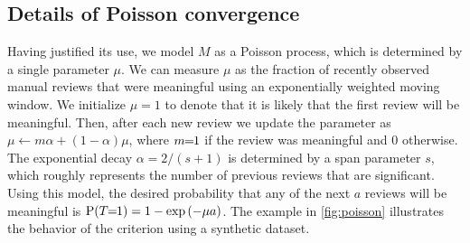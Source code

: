 \subsection{Details of Poisson convergence}

Having justified its use, we model $M$ as a Poisson process, which is determined by a single parameter $\mu$.
We can measure $\mu$ as the fraction of recently observed manual reviews that were meaningful using an
  exponentially weighted moving window.
We initialize $\mu=1$ to denote that it is likely that the first review will be meaningful.
Then, after each new review we update the parameter as %
$\mu \leftarrow m \alpha + (1 - \alpha) \mu$, where $m\mkern-6mu=\mkern-6mu1$ if the review was meaningful and $0$ otherwise.
The exponential decay $\alpha = 2 / (s + 1)$ is determined by a span parameter $s$, which roughly represents the
  number of previous reviews that are significant.
Using this model, the desired probability that any of the next $a$ reviews will be meaningful is %
$\mathbin{\operatorname{P}}(T\mkern-6mu=\mkern-6mu1) = 1 - \textrm{exp}\left(-\mu  a\right)$.
The example in \cref{fig:poisson} illustrates the behavior of the criterion using a synthetic dataset.



\begin{comment}
Another alternative might be measuring once the advantages from the ranking
algorithm become indistinguishable from a brute force search.


Let $D = \binom{|V|}{2}$ be the number of edges in the dataset and let $N=\sum_{C \in \set{C}} (|C| - 1)$ the
  number of edges in the MSTs of all PCCs.
We can measure the density of meaninful reviews in the current labeled dataset as $N/D$.

After our estimated mu gets close enough to to $N/D$, we can terminate.

\end{comment}

\poisson{}

